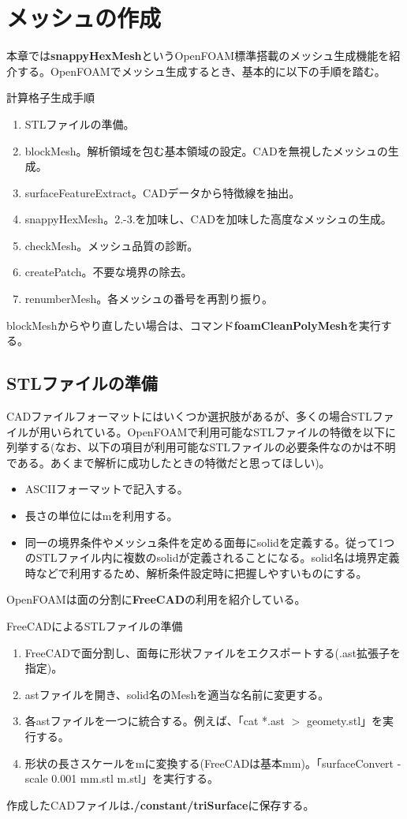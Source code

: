 \documentclass[dvipdfmx, 9pt, a4paper]{jsarticle}
\numberwithin{equation}{section}
\begin{document}
\section{メッシュの作成}
本章では{\bf snappyHexMesh}というOpenFOAM標準搭載のメッシュ生成機能を紹介する。OpenFOAMでメッシュ生成するとき、基本的に以下の手順を踏む。
\begin{itembox}[l]{計算格子生成手順}
\begin{enumerate}
\item STLファイルの準備。
\item blockMesh。解析領域を包む基本領域の設定。CADを無視したメッシュの生成。
\item surfaceFeatureExtract。CADデータから特徴線を抽出。
\item snappyHexMesh。2.-3.を加味し、CADを加味した高度なメッシュの生成。
\item checkMesh。メッシュ品質の診断。
\item createPatch。不要な境界の除去。
\item renumberMesh。各メッシュの番号を再割り振り。
\end{enumerate}
\end{itembox}
blockMeshからやり直したい場合は、コマンド{\bf foamCleanPolyMesh}を実行する。\par

\subsection{STLファイルの準備}
CADファイルフォーマットにはいくつか選択肢があるが、多くの場合STLファイルが用いられている。OpenFOAMで利用可能なSTLファイルの特徴を以下に列挙する(なお、以下の項目が利用可能なSTLファイルの必要条件なのかは不明である。あくまで解析に成功したときの特徴だと思ってほしい)。
\begin{itemize}
\item ASCIIフォーマットで記入する。
\item 長さの単位にはmを利用する。
\item 同一の境界条件やメッシュ条件を定める面毎にsolidを定義する。従って1つのSTLファイル内に複数のsolidが定義されることになる。solid名は境界定義時などで利用するため、解析条件設定時に把握しやすいものにする。
\end{itemize}\par
OpenFOAMは面の分割に{\bf FreeCAD}の利用を紹介している。
\begin{itembox}[l]{FreeCADによるSTLファイルの準備}
\begin{enumerate}
\item FreeCADで面分割し、面毎に形状ファイルをエクスポートする(.ast拡張子を指定)。
\item astファイルを開き、solid名のMeshを適当な名前に変更する。
\item 各astファイルを一つに統合する。例えば、「cat *.ast $>$ geomety.stl」を実行する。
\item 形状の長さスケールをmに変換する(FreeCADは基本mm)。「surfaceConvert -scale 0.001 mm.stl m.stl」を実行する。
\end{enumerate}
\end{itembox}
作成したCADファイルは{\bf ./constant/triSurface}に保存する。\par
\end{document}
